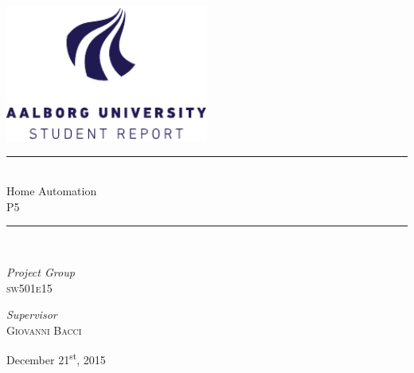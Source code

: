 \begin{titlepage}
\begin{center}
\newcommand{\HRule}{\rule{\linewidth}{0.5mm}}

\includegraphics[width=0.5\textwidth]{aau_logo_en.pdf}~\\[1cm]



\HRule \\[0.4cm]
{ \huge Home Automation\\[0.4cm]
  \large \textsc{P5}}

\HRule \\[1.5cm]

\begin{minipage}{0.4\textwidth}
\begin{flushleft} \large
\emph{Project Group}\\
\textsc{sw501e15}
\end{flushleft}
\end{minipage}
\begin{minipage}{0.4\textwidth}
\begin{flushright} \large
\emph{Supervisor} \\
\textsc{Giovanni Bacci}
\end{flushright}
\end{minipage}

\vfill

{\large December 21\textsuperscript{st}, 2015}

\end{center}
\end{titlepage}
